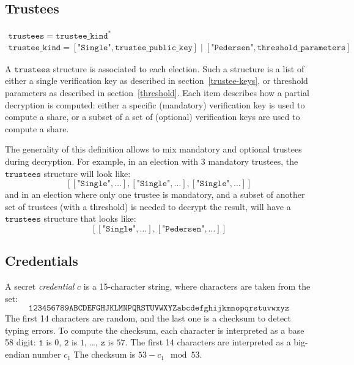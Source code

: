 \documentclass[a4paper]{article}
\begin{document}
\subsection{Trustees}
\label{trustees}

\begin{gather*}
  \texttt{trustees}=\texttt{trustee\_kind}^\ast\\
  \texttt{trustee\_kind}=
  [\texttt{"Single"},\texttt{trustee\_public\_key}]\mid
  [\texttt{"Pedersen"},\texttt{threshold\_parameters}]
\end{gather*}

A $\texttt{trustees}$ structure is associated to each election. Such a
structure is a list of either a single verification key as described in
section~\ref{trustee-keys}, or threshold parameters as described in
section~\ref{threshold}.  Each item describes how a partial decryption
is computed: either a specific (mandatory) verification key is used to
compute a share, or a subset of a set of (optional) verification keys
are used to compute a share.

The generality of this definition allows to mix mandatory and optional
trustees during decryption. For example, in an election with 3
mandatory trustees, the $\texttt{trustees}$ structure will look like:
\[
  [[\texttt{"Single"},\dotsc],[\texttt{"Single"},\dotsc],[\texttt{"Single"},\dotsc]]
\]
and in an election where only one trustee is mandatory, and a subset
of another set of trustees (with a threshold) is needed to decrypt the
result, will have a $\texttt{trustees}$ structure that looks like:
\[
  [[\texttt{"Single"},\dotsc],[\texttt{"Pedersen"},\dotsc]]
\]

\subsection{Credentials}
\label{credentials}

\newcommand{\secret}{\texttt{secret}}

A secret \emph{credential} $c$ is a 15-character string, where characters are
taken from the set:
\[\texttt{123456789ABCDEFGHJKLMNPQRSTUVWXYZabcdefghijkmnopqrstuvwxyz}\]
The first 14 characters are random, and the last one is a checksum to
detect typing errors. To compute the checksum, each character is
interpreted as a base 58 digit: $\texttt{1}$ is $0$, $\texttt{2}$ is
$1$, \dots, $\texttt{z}$ is $57$. The first 14 characters are
interpreted as a big-endian number $c_1$ The checksum is $53-c_1\mod
53$.
\end{document}
